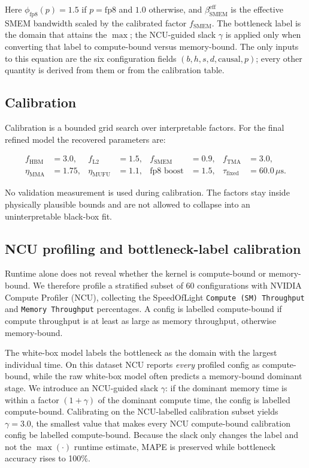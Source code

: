 \documentclass[
  11pt,
]{article}
\begin{document}
Here \(\phi_{\text{fp8}}(p) = 1.5\) if \(p = \text{fp8}\) and \(1.0\)
otherwise, and \(\beta_{\text{SMEM}}^{\text{eff}}\) is the effective
SMEM bandwidth scaled by the calibrated factor \(f_{\text{SMEM}}\). The
bottleneck label is the domain that attains the \(\max\); the NCU-guided
slack \(\gamma\) is applied only when converting that label to
compute-bound versus memory-bound. The only inputs to this equation are
the six configuration fields \((b, h, s, d, \text{causal}, p)\); every
other quantity is derived from them or from the calibration table.

\subsection{Calibration}\label{calibration}

Calibration is a bounded grid search over interpretable factors. For the
final refined model the recovered parameters are:

\[
\begin{aligned}
f_{\text{HBM}} &= 3.0, & f_{\text{L2}} &= 1.5, & f_{\text{SMEM}} &= 0.9, & f_{\text{TMA}} &= 3.0, \\
\eta_{\text{MMA}} &= 1.75, & \eta_{\text{MUFU}} &= 1.1, & \text{fp8 boost} &= 1.5, & \tau_{\text{fixed}} &= 60.0\,\mu\text{s}.
\end{aligned}
\]

No validation measurement is used during calibration. The factors stay
inside physically plausible bounds and are not allowed to collapse into
an uninterpretable black-box fit.

\subsection{NCU profiling and bottleneck-label
calibration}\label{ncu-profiling-and-bottleneck-label-calibration}

Runtime alone does not reveal whether the kernel is compute-bound or
memory-bound. We therefore profile a stratified subset of 60
configurations with NVIDIA Compute Profiler (NCU), collecting the
SpeedOfLight \texttt{Compute\ (SM)\ Throughput} and
\texttt{Memory\ Throughput} percentages. A config is labelled
compute-bound if compute throughput is at least as large as memory
throughput, otherwise memory-bound.

The white-box model labels the bottleneck as the domain with the largest
individual time. On this dataset NCU reports \emph{every} profiled
config as compute-bound, while the raw white-box model often predicts a
memory-bound dominant stage. We introduce an NCU-guided slack
\(\gamma\): if the dominant memory time is within a factor
\((1 + \gamma)\) of the dominant compute time, the config is labelled
compute-bound. Calibrating on the NCU-labelled calibration subset yields
\(\gamma = 3.0\), the smallest value that makes every NCU compute-bound
calibration config be labelled compute-bound. Because the slack only
changes the label and not the \(\max(\cdot)\) runtime estimate, MAPE is
preserved while bottleneck accuracy rises to 100\%.
\end{document}
